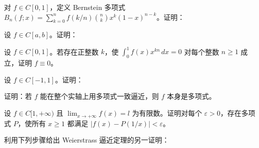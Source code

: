 \noindent\begin{minipage}{\textwidth}
对 $f\in C[0,1]$，定义 Bernstein 多项式 $B_n(f;x)=\sum_{k=0}^nf(k/n)\binom nk x^k(1-x)^{n-k}$。证明：
\end{minipage}\par\vfill
\newpage
\noindent\begin{minipage}{\textwidth}
设 $f\in C[a,b]$。证明：
\end{minipage}\par\vfill
\noindent\begin{minipage}{\textwidth}
设 $f\in C[0,1]$。若存在正整数 $k$，使 $\int_0^1f(x)x^{kn}\,dx=0$ 对每个整数 $n\ge1$ 成立，证明 $f\equiv0$。
\end{minipage}\par\vfill
\noindent\begin{minipage}{\textwidth}
设 $f\in C[-1,1]$。证明：
\end{minipage}\par\vfill
\newpage
\noindent\begin{minipage}{\textwidth}
证明：若 $f$ 能在整个实轴上用多项式一致逼近，则 $f$ 本身是多项式。
\end{minipage}\par\vfill
\noindent\begin{minipage}{\textwidth}
设 $f\in C[1,+\infty)$ 且 $\lim_{x\to+\infty}f(x)=l$ 为有限数。证明对每个 $\varepsilon>0$，存在多项式 $P$，使所有 $x\ge1$ 都满足 $|f(x)-P(1/x)|<\varepsilon$。
\end{minipage}\par\vfill
\noindent\begin{minipage}{\textwidth}
利用下列步骤给出 Weierstrass 逼近定理的另一证明：
\end{minipage}\par\vfill
